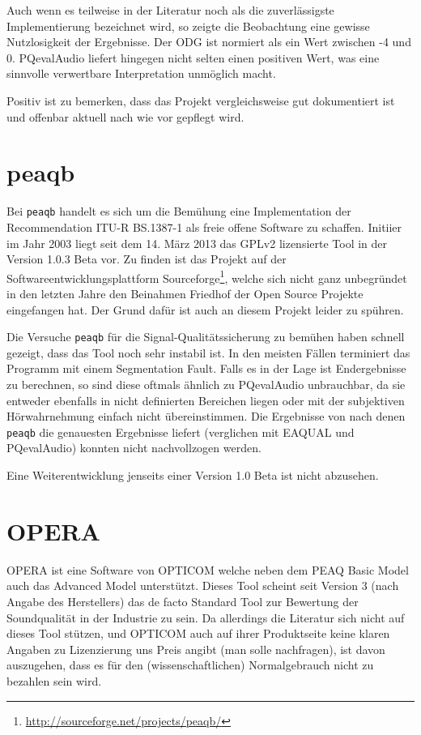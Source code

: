 Auch wenn es teilweise in der Literatur noch als die zuverlässigste Implementierung bezeichnet wird\cite{nishimura2013objective}, so zeigte die Beobachtung eine gewisse Nutzlosigkeit der Ergebnisse. Der ODG ist normiert als ein Wert zwischen -4 und 0. PQevalAudio liefert hingegen nicht selten einen positiven Wert, was eine sinnvolle verwertbare Interpretation unmöglich macht.

Positiv ist zu bemerken, dass das Projekt vergleichsweise gut dokumentiert ist und offenbar aktuell nach wie vor gepflegt wird.

\section{peaqb}

Bei \texttt{peaqb} handelt es sich um die Bemühung eine Implementation der Recommendation ITU-R BS.1387-1 als freie offene Software zu schaffen. Initiier im Jahr 2003 liegt seit dem 14. März 2013 das GPLv2 lizensierte Tool in der Version 1.0.3 Beta vor. Zu finden ist das Projekt auf der Softwareentwicklungsplattform Sourceforge\footnote{\url{http://sourceforge.net/projects/peaqb/}}, welche sich nicht ganz unbegr\"undet in den letzten Jahre den Beinahmen \glqq Friedhof der Open Source Projekte\grqq{} eingefangen hat. Der Grund daf\"ur ist auch an diesem Projekt leider zu sp\"uhren. 

Die Versuche \texttt{peaqb} für die Signal-Qualitätssicherung zu bem\"uhen haben schnell gezeigt, dass das Tool noch sehr instabil ist. In den meisten Fällen terminiert das Programm mit einem Segmentation Fault. Falls es in der Lage ist Endergebnisse zu berechnen, so sind diese oftmals ähnlich zu PQevalAudio unbrauchbar, da sie entweder ebenfalls in nicht definierten Bereichen liegen oder mit der subjektiven H\"orwahrnehmung einfach nicht \"ubereinstimmen. Die Ergebnisse von \cite{kondo2012use} nach denen \texttt{peaqb} die genauesten Ergebnisse liefert (verglichen mit EAQUAL und PQevalAudio) konnten nicht nachvollzogen werden.

Eine Weiterentwicklung jenseits einer Version 1.0 Beta ist nicht abzusehen. 

\section{OPERA}

OPERA ist eine Software von OPTICOM welche neben dem PEAQ Basic Model auch das Advanced Model unterstützt. Dieses Tool scheint seit Version 3 (nach Angabe des Herstellers) das de facto Standard Tool zur Bewertung der Soundqualität in der Industrie zu sein. Da allerdings die Literatur sich nicht auf dieses Tool stützen, und OPTICOM auch auf ihrer Produktseite keine klaren Angaben zu Lizenzierung uns Preis angibt (man solle nachfragen), ist davon auszugehen, dass es für den (wissenschaftlichen) \glqq{}Normalgebrauch\grqq{} nicht zu bezahlen sein wird.



